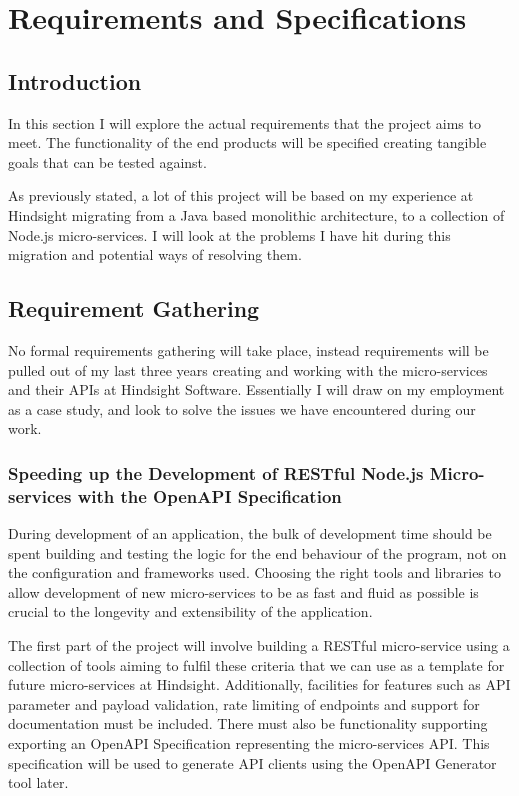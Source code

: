 \chapter{Requirements and Specifications}

\section{Introduction}
In this section I will explore the actual requirements that the project aims to meet. The functionality of the end products will be specified creating tangible goals that can be tested against.

As previously stated, a lot of this project will be based on my experience at Hindsight migrating from a Java based monolithic architecture, to a collection of Node.js micro-services. I will look at the problems I have hit during this migration and potential ways of resolving them.

\section{Requirement Gathering}
No formal requirements gathering will take place, instead requirements will be pulled out of my last three years creating and working with the micro-services and their APIs at Hindsight Software. Essentially I will draw on my employment as a case study, and look to solve the issues we have encountered during our work.

\subsection{Speeding up the Development of RESTful Node.js Micro-services with the OpenAPI Specification}
During development of an application, the bulk of development time should be spent building and testing the logic for the end behaviour of the program, not on the configuration and frameworks used. Choosing the right tools and libraries to allow development of new micro-services to be as fast and fluid as possible is crucial to the longevity and extensibility of the application.

The first part of the project will involve building a RESTful micro-service using a collection of tools aiming to fulfil these criteria that we can use as a template for future micro-services at Hindsight. Additionally, facilities for features such as API parameter and payload validation, rate limiting of endpoints and support for documentation must be included. There must also be functionality supporting exporting an OpenAPI Specification representing the micro-services API. This specification will be used to generate API clients using the OpenAPI Generator tool later.

